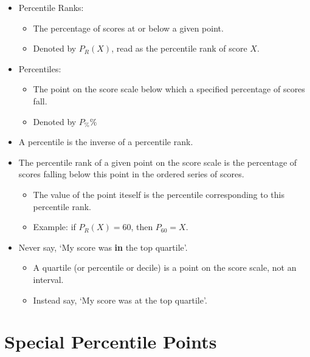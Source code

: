 \documentclass[12pt]{article}
\begin{document}
\begin{itemize}
\itemsep1pt\parskip0pt
\item
  Percentile Ranks:

  \begin{itemize}
  \itemsep1pt\parskip0pt
  \item
    The percentage of scores at or below a given point.
  \item
    Denoted by \(P_{R}(X)\), read as the percentile rank of score \(X\).
  \end{itemize}
\item
  Percentiles:

  \begin{itemize}
  \itemsep1pt\parskip0pt
  \item
    The point on the score scale below which a specified percentage of
    scores fall.
  \item
    Denoted by $P_{\%}\%$
  \end{itemize}
\item
  A percentile is the inverse of a percentile rank.
\item
  The percentile rank of a given point on the score scale is the
  percentage of scores falling below this point in the ordered series of
  scores.

  \begin{itemize}
  \itemsep1pt\parskip0pt
  \item
    The value of the point iteself is the percentile corresponding to
    this percentile rank.
  \item
    Example: if \(P_{R}(X) = 60\), then \(P_{60} = X\).
  \end{itemize}
\item
  Never say, `My score was \textbf{in} the top quartile'.

  \begin{itemize}
  \itemsep1pt\parskip0pt
  \item
    A quartile (or percentile or decile) is a point on the score scale,
    not an interval.
  \item
    Instead say, `My score was at the top quartile'.
  \end{itemize}
\end{itemize}

\section{Special Percentile Points}\label{special-percentile-points}
\end{document}
